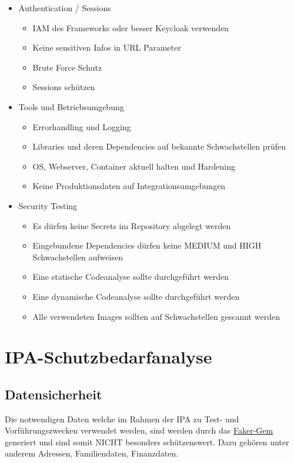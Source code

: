 \begin{itemize}
    \item Authentication / Sessions
    \begin{itemize}
        \item{IAM des Frameworks oder besser Keycloak verwenden}
        \item{Keine sensitiven Infos in URL Parameter}
        \item{Brute Force Schutz}
        \item{ Sessions schützen}
    \end{itemize}
    \item Tools und Betriebsumgebung
    \begin{itemize}
        \item{Errorhandling und Logging}
        \item{Libraries und deren Dependencies auf bekannte Schwachstellen prüfen}
        \item{OS, Webserver, Container aktuell halten und Hardening}
        \item{Keine Produktionsdaten auf Integrationsumgebungen}
    \end{itemize}
    \item Security Testing
    \begin{itemize}
        \item{Es dürfen keine Secrets im Repository abgelegt werden}
        \item{Eingebundene Dependencies dürfen keine MEDIUM und HIGH Schwachstellen aufweisen}
        \item{Eine statische Codeanalyse sollte durchgeführt werden}
        \item{Eine dynamische Codeanalyse sollte durchgeführt werden}
        \item{Alle verwendeten Images sollten auf Schwachstellen gescannt werden}
    \end{itemize}
\end{itemize}

\chapter{IPA-Schutzbedarfanalyse}

\section{Datensicherheit}
Die notwendigen Daten welche im Rahmen der IPA zu Test- und Vorführungszwecken verwendet werden,
sind werden durch das \href{https://github.com/faker-ruby/faker}{Faker-Gem} generiert und sind somit NICHT 
besonders schützenswert. Dazu gehören unter anderem Adressen, Familiendaten, Finanzdaten.

